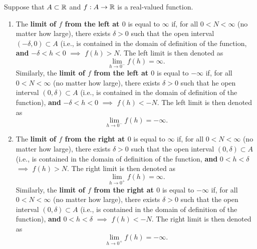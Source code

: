 \begin{tcolorbox}[colback=mylightblue, title = {\bf Unbounded One-sided Limits at $0$}, breakable]

\begin{definition}
\label{def:UnboundedOneSidedlimitsAtZero}
Suppose that $A \subset \mathbb R$ and $f:A \to  \mathbb R$ is a real-valued function.

\begin{enumerate}
\renewcommand{\labelenumi}{(\alph{enumi})}
\setlength{\itemsep}{.2cm}
    \item The \textbf{limit of $f$ from the left at $0$} is equal to $\infty$ if, for all $0<N < \infty$ (no matter how large), there exists $\delta > 0$ such that the open interval $(-\delta, 0) \subset A$ (i.e., is contained in the domain of definition of the function, \textbf{and} $-\delta < h < 0$ $\implies$ $f(h)>N$. The left limit is then denoted as
    $$ \lim_{h \to 0^-} f(h) = \infty.$$ 
    Similarly, the \textbf{limit of $f$ from the left at $0$} is equal to $-\infty$ if, for all $0<N < \infty$  (no matter how large), there exists $\delta > 0$ such that he open interval $(0, \delta) \subset A$ (i.e., is contained in the domain of definition of the function), \textbf{and} $-\delta < h < 0$ $\implies$ $f(h)< -N$. The left limit is then denoted as
    $$ \lim_{h \to 0^-} f(h) = -\infty.$$ 

  \item The \textbf{limit of $f$ from the right at $0$} is equal to $\infty$ if, for all $0<N < \infty$ (no matter how large), there exists $\delta > 0$ such that the open interval $(0, \delta) \subset A$ (i.e., is contained in the domain of definition of the function, \textbf{and} $0 < h < \delta$ $\implies$ $f(h)>N$. The right limit is then denoted as
    $$ \lim_{h \to 0^+} f(h) = \infty.$$ 
    Similarly, the \textbf{limit of $f$ from the right at $0$} is equal to $-\infty$ if, for all $0<N < \infty$  (no matter how large), there exists $\delta > 0$ such that the open interval $(0, \delta) \subset A$ (i.e., is contained in the domain of definition of the function), \textbf{and} $0< h < \delta$ $\implies$ $f(h)< -N$. The right limit is then denoted as
    $$ \lim_{h \to 0^+} f(h) = -\infty.$$  
\end{enumerate}

\end{definition}

\end{tcolorbox}

\bigskip

